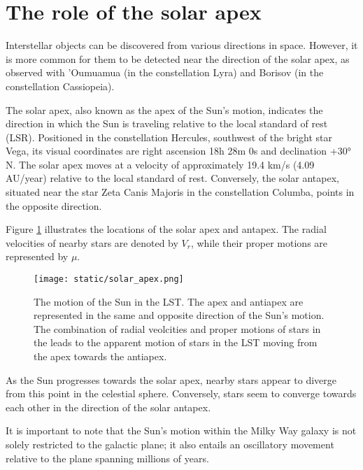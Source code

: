 \section{The role of the solar apex}


Interstellar objects can be discovered from various directions in space.
However, it is more common for them to be detected near the direction of the
solar apex, as observed with 'Oumuamua (in the constellation Lyra) and Borisov
(in the constellation Cassiopeia).

The solar apex, also known as the apex of the Sun's motion, indicates the
direction in which the Sun is traveling relative to the local standard of rest
(LSR). Positioned in the constellation Hercules, southwest of the bright star
Vega, its visual coordinates are right ascension 18h 28m 0s and declination +30°
N. The solar apex moves at a velocity of approximately 19.4 km/s (4.09 AU/year)
relative to the local standard of rest. Conversely, the solar antapex, situated
near the star Zeta Canis Majoris in the constellation Columba, points in the
opposite direction.

Figure \ref{fig:solar_apex} illustrates the locations of the solar apex and
antapex. The radial velocities of nearby stars are denoted by $V_r$, while their
proper motions are represented by $\mu$.

\begin{figure}[H]
  \centering
  \texttt{[image: static/solar\_apex.png]}
  \caption[The motion of the Sun in the LST.]
  {
    The motion of the Sun in the LST. The apex and antiapex are
    represented in the same and opposite direction of the Sun's motion.
    The combination of radial veolcities and proper motions of stars in the
    leads to the apparent motion of stars in the LST moving from the apex
    towards the antiapex.
  }
  \label{fig:solar_apex}
\end{figure}

As the Sun progresses towards the solar apex, nearby stars appear to diverge
from this point in the celestial sphere. Conversely, stars seem to converge
towards each other in the direction of the solar antapex.

It is important to note that the Sun's motion within the Milky Way galaxy is not
solely restricted to the galactic plane; it also entails an oscillatory movement
relative to the plane spanning millions of years.


